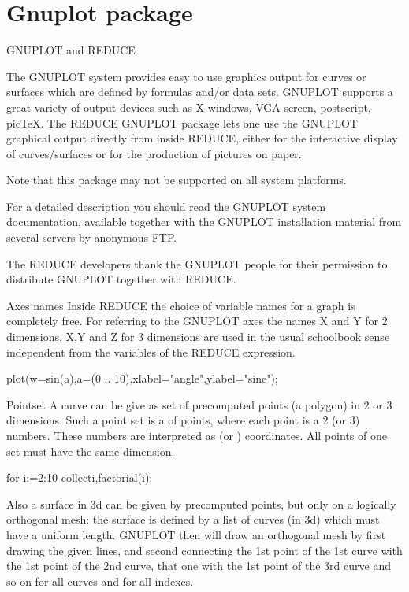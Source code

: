 \section{Gnuplot package}

\begin{Introduction}{GNUPLOT and REDUCE}

The GNUPLOT system provides easy to use graphics output
for curves or surfaces which are defined by
formulas and/or data sets. GNUPLOT supports
a great variety of output devices
such as X-windows, VGA screen, postscript, picTeX.
The REDUCE GNUPLOT package lets one use the GNUPLOT
graphical output directly from inside REDUCE, either for
the interactive display of curves/surfaces or for the production
of pictures on paper.

Note that this package may not be supported on all system
platforms.

For a detailed description you should read the GNUPLOT
system documentation, available together with the GNUPLOT
installation material from several servers by anonymous FTP.

The REDUCE developers thank the GNUPLOT people for their permission
to distribute GNUPLOT together with REDUCE.
\end{Introduction}

\begin{Concept}{Axes names}
Inside REDUCE the choice of variable names for a graph is completely
free. For referring to the GNUPLOT axes the names
X and Y for 2 dimensions, X,Y and Z for 3 dimensions are used
in the usual schoolbook sense independent from the variables of
the REDUCE expression.

\begin{Examples}
  plot(w=sin(a),a=(0 .. 10),xlabel="angle",ylabel="sine");
\end{Examples}

\end{Concept}

\begin{Type}{Pointset}
A curve can be give as set of precomputed points (a polygon)
in 2 or 3 dimensions. Such a point set is a 
of points, where each point is a  2 (or 3)
numbers. These numbers are interpreted as 
(or ) coordinates. All points of one set must have
the same dimension.

\begin{Examples}
 for i:=2:10 collect{i,factorial(i)};

\end{Examples}

Also a surface in 3d can be given by precomputed points,
but only on a logically orthogonal mesh: the surface is defined
by a list of curves (in 3d) which must have a uniform length.
GNUPLOT then will draw an orthogonal mesh by first drawing the
given lines, and second connecting the 1st point of the 1st curve
with the 1st point of the 2nd curve, that one with the 1st point
of the 3rd curve and so on for all curves and for all indexes.


\end{Type}


